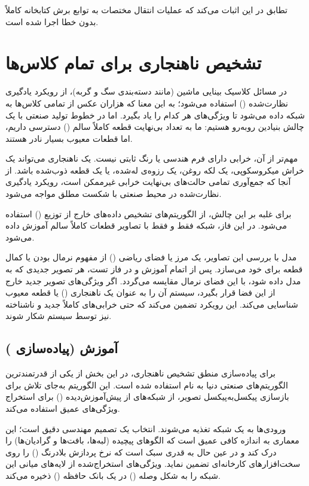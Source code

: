 \documentclass{article}
\begin{document}
تطابق در این  اثبات می‌کند که عملیات انتقال مختصات  به توابع برش کتابخانه  کاملاً بدون خطا اجرا شده است.

\section{تشخیص ناهنجاری برای تمام کلاس‌ها}


در مسائل کلاسیک بینایی ماشین (مانند دسته‌بندی سگ و گربه)، از رویکرد یادگیری نظارت‌شده () استفاده می‌شود؛ به این معنا که هزاران عکس از تمامی کلاس‌ها به شبکه داده می‌شود تا ویژگی‌های هر کدام را یاد بگیرد. اما در خطوط تولید صنعتی با یک چالش بنیادین روبه‌رو هستیم: ما به تعداد بی‌نهایت قطعه کاملاً سالم () دسترسی داریم، اما قطعات معیوب بسیار نادر هستند.

مهم‌تر از آن، خرابی دارای فرم هندسی یا رنگ ثابتی نیست. یک ناهنجاری می‌تواند یک خراش میکروسکوپی، یک لکه روغن، یک رزوه‌ی له‌شده، یا یک قطعه ذوب‌شده باشد. از آنجا که جمع‌آوری تمامی حالت‌های بی‌نهایت خرابی غیرممکن است، رویکرد یادگیری نظارت‌شده در محیط صنعتی با شکست مطلق مواجه می‌شود.


برای غلبه بر این چالش، از الگوریتم‌های تشخیص داده‌های خارج از توزیع () استفاده می‌شود. در این فاز، شبکه فقط و فقط با تصاویر قطعات کاملاً سالم آموزش داده می‌شود.

مدل با بررسی این تصاویر، یک مرز یا فضای ریاضی () از مفهوم نرمال بودن یا کمال قطعه برای خود می‌سازد. پس از اتمام آموزش و در فاز تست، هر تصویر جدیدی که به مدل داده شود، با این فضای نرمال مقایسه می‌گردد. اگر ویژگی‌های تصویر جدید خارج از این فضا قرار بگیرد، سیستم آن را به عنوان یک ناهنجاری () یا قطعه معیوب شناسایی می‌کند. این رویکرد تضمین می‌کند که حتی خرابی‌های کاملاً جدید و ناشناخته نیز توسط سیستم شکار شوند.

\subsection{آموزش  (پیاده‌سازی )}

برای پیاده‌سازی منطق تشخیص ناهنجاری، در این بخش از یکی از قدرتمندترین الگوریتم‌های صنعتی دنیا به نام  استفاده شده است. این الگوریتم به‌جای تلاش برای بازسازی پیکسل‌به‌پیکسل تصویر، از شبکه‌های از پیش‌آموزش‌دیده () برای استخراج ویژگی‌های عمیق استفاده می‌کند.

ورودی‌ها به یک شبکه  تغذیه می‌شوند. انتخاب  یک تصمیم مهندسی دقیق است؛ این معماری به اندازه کافی عمیق است که الگوهای پیچیده (لبه‌ها، بافت‌ها و گرادیان‌ها) را درک کند و در عین حال به قدری سبک است که نرخ پردازش بلادرنگ () را روی سخت‌افزارهای کارخانه‌ای تضمین نماید.  ویژگی‌های استخراج‌شده از لایه‌های میانی این شبکه را به شکل وصله () در یک بانک حافظه () ذخیره می‌کند.
\end{document}
